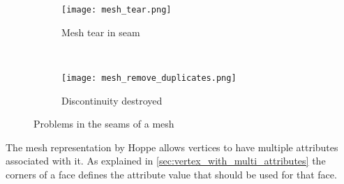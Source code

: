\begin{figure}[ht]
  \centering
  \begin{subfigure}[b]{.45\textwidth} 
    \texttt{[image: mesh\_tear.png]}
    \caption{Mesh tear in seam}
    \label{fig:mesh_tear}
  \end{subfigure}
  ~
  \begin{subfigure}[b]{.45\textwidth}
    \texttt{[image: mesh\_remove\_duplicates.png]}
    \caption{Discontinuity destroyed}
    \label{fig:mesh_discontinuity}
  \end{subfigure}
  \caption{Problems in the seams of a mesh}
  \label{fig:mesh_seam_problems}
\end{figure}

The mesh representation by Hoppe \cite{hoppe1998efficient} allows vertices to have multiple attributes associated with it. As explained in \cref{sec:vertex_with_multi_attributes} the corners of a face defines the attribute value that should be used for that face.

\iffalse
\begin{figure}[ht]
    \centering
    \texttt{[image: vertex\_wedge\_corner.eps]}
    \caption{Multi-attribute vertex}
    \label{fig:vertex_wedge_corner}
\end{figure}
\fi


